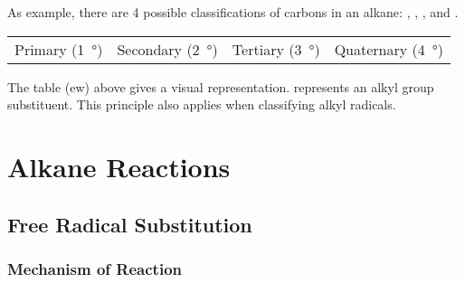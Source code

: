		As example, there are 4 possible classifications of carbons in an alkane: , , ,
		and .

		\begin{center}\begin{table}[ht]\renewcommand{\arraystretch}{1.4}
		\begin{tabu} to \textwidth {| X[c,m] | X[c,m] | X[c,m] | X[c,m] |}

			\hline
			\vspace{2mm}								\vspace{2mm}	&
			\vspace{2mm}						\vspace{2mm}	&
			\vspace{2mm}				\vspace{2mm}	&
			\vspace{2mm}		\vspace{2mm}	\\

			\hline
			Primary (\SI{1}{\degree})		&
			Secondary (\SI{2}{\degree})		&
			Tertiary (\SI{3}{\degree})		&
			Quaternary (\SI{4}{\degree})	\\
			\hline

		\end{tabu}
		\end{table}\end{center}\vspace{-10mm}

		The table (ew) above gives a visual representation.  represents an alkyl group substituent. This principle
		also applies when classifying alkyl radicals.



	\pagebreak
	\section{Alkane Reactions}
		\subsection{Free Radical Substitution}

			\subsubsection{Mechanism of Reaction}


